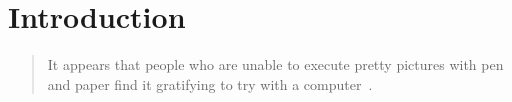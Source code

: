 \newcommand{\bq}{}
\newcommand{\dpic}{{\bq dpic}\xspace}
\newcommand{\Dpic}{{\bq Dpic}\xspace}
\newcommand{\dvips}{{\bq dvips}\xspace}
\newcommand{\gpic}{{\bq gpic}\xspace}
\newcommand{\Gpic}{{\bq Gpic}\xspace}
\newcommand{\groff}{{\bq groff}\xspace}
\newcommand{\latex}{\LaTeX\xspace}
\newcommand{\linespec}{{\sl linespec}\xspace}
\newcommand{\MetaPost}{{\bq MetaPost}\xspace}
\newcommand{\Mfour}{{\bq m4}\xspace}
\newcommand{\mfpic}{{\bq mfpic}\xspace}
\newcommand{\PDF}{{\bq PDF}\xspace}
\newcommand{\pic}{{\bq pic}\xspace}
\newcommand{\Pic}{{\bq Pic}\xspace}
\newcommand{\Postscript}{{\bq Postscript}\xspace}
\newcommand{\PSTricks}{{\bq PSTricks}\xspace}
\newcommand{\SVG}{{\bq SVG}\xspace}
\newcommand{\tex}{\TeX\xspace}
\newcommand{\Textregistered}{\textregistered\xspace}
\newcommand{\TPGF}{{\bq Ti{\it k}z~PGF}\xspace}
\newcommand{\Tikz}{{\bq Ti{\it k}z}\xspace}
\newcommand{\tpic}{{\bq tpic}\xspace}
\newcommand{\xfig}{{\bq xfig}\xspace}
\newcommand{\Xfig}{{\bq Xfig}\xspace}
%
\newcommand{\xection}[1]{\section[\texorpdfstring{#1\ \dotfill}{#1}]{#1}}
\newcommand{\NVL}{\\\hspace*{\parindent}}
\newcommand{\brtt}{\hfill\break\hspace*\parindent}
\newcommand{\lbr}{{\tt\char123}}
\newcommand{\rbr}{{\tt\char125}}
\newcommand{\bsl}{{\tt\char92}}
\newcommand{\SR}[1]{\hyperref[#1]{Section~\ref*{#1}}}
\newcommand{\PR}[1]{\hyperref[#1]{page~\pageref*{#1}}}
\newcommand{\FR}[1]{\hyperref[#1]{Figure~\ref*{#1}}}
\newcommand{\FRS}[1]{\hyperref[#1]{Figures~\ref*{#1}}}
\newcommand{\REF}[1]{\hyperref[#1]{\ref*{#1}}}
\newcommand{\LQ}{\char96}
\newcommand{\RQ}{\char39}
%
\newcommand{\Example}[1]{\vspace{\parsep}\noindent {\bf Example #1:}}
%
\begin{multicols}{2}
  \tableofcontents
\end{multicols}
%
\xection{Introduction\label{Introduction:}}
   \begin{quotation}\noindent
   It appears that people
   who are unable to execute pretty pictures with pen and paper find it
   gratifying to try with a computer~\cite{Landauer95}.
   \end{quotation}

